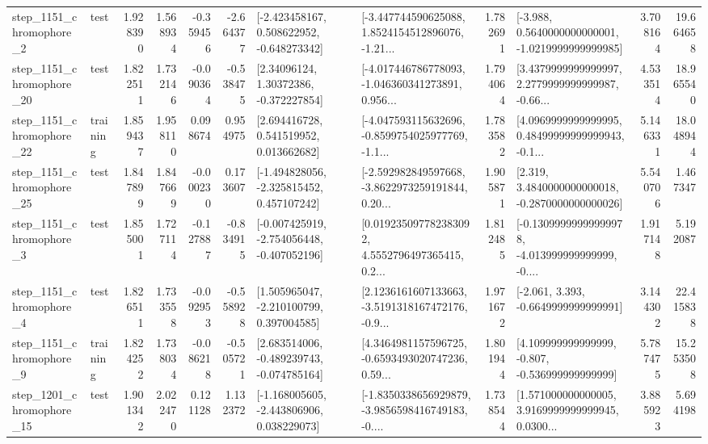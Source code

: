 \begin{tabular}{llrrrrllrlrr}
  step\_1151\_chromophore\_2 &      test &      1.928390 &    1.568934 &     -0.359456 & -2.664377 &   [-2.423458167, 0.508622952, -0.648273342] &  [-3.447744590625088, 1.8524154512896076, -1.21... &       1.782691 &  [-3.988, 0.5640000000000001, -1.0219999999999985] &            3.708164 &         19.664658 \\
 step\_1151\_chromophore\_20 &      test &      1.822511 &    1.732146 &     -0.090364 & -0.538475 &      [2.34096124, 1.30372386, -0.372227854] &  [-4.017446786778093, -1.046360341273891, 0.956... &       1.794064 &  [3.4379999999999997, 2.2779999999999987, -0.66... &            4.533514 &         18.965540 \\
 step\_1151\_chromophore\_22 &  training &      1.859437 &    1.958110 &      0.098674 &  0.954975 &     [2.694416728, 0.541519952, 0.013662682] &  [-4.047593115632696, -0.8599754025977769, -1.1... &       1.783582 &  [4.0969999999999995, 0.48499999999999943, -0.1... &            5.146331 &         18.048944 \\
 step\_1151\_chromophore\_25 &      test &      1.847899 &    1.847669 &     -0.000230 &  0.173607 &   [-1.494828056, -2.325815452, 0.457107242] &  [-2.592982849597668, -3.8622973259191844, 0.20... &       1.905871 &   [2.319, 3.4840000000000018, -0.2870000000000026] &            5.540706 &          1.467347 \\
  step\_1151\_chromophore\_3 &      test &      1.855001 &    1.727114 &     -0.127887 & -0.834915 &  [-0.007425919, -2.754056448, -0.407052196] &  [0.019235097782383092, 4.5552796497365415, 0.2... &       1.812485 &  [-0.13099999999999978, -4.013999999999999, -0.... &            1.917148 &          5.192087 \\
  step\_1151\_chromophore\_4 &      test &      1.826511 &    1.733558 &     -0.092953 & -0.558928 &    [1.505965047, -2.210100799, 0.397004585] &  [2.1236161607133663, -3.5191318167472176, -0.9... &       1.971672 &               [-2.061, 3.393, -0.6649999999999991] &            3.144302 &         22.415838 \\
  step\_1151\_chromophore\_9 &  training &      1.824252 &    1.738034 &     -0.086218 & -0.505721 &   [2.683514006, -0.489239743, -0.074785164] &  [4.3464981157596725, -0.6593493020747236, 0.59... &       1.801944 &    [4.109999999999999, -0.807, -0.536999999999999] &            5.787475 &         15.253508 \\
 step\_1201\_chromophore\_15 &      test &      1.901342 &    2.022470 &      0.121128 &  1.132372 &   [-1.168005605, -2.443806906, 0.038229073] &  [-1.8350338656929879, -3.9856598416749183, -0.... &       1.738544 &  [1.571000000000005, 3.9169999999999945, 0.0300... &            3.885923 &          5.694198 \\

\end{tabular}
